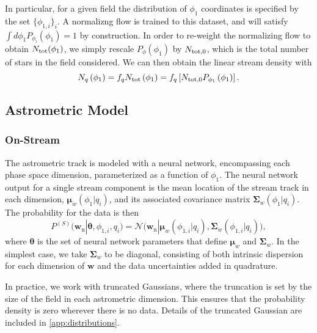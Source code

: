 \documentclass[twocolumn]{aastex631}
\newcommand{\mrm}[1]{\mathrm{#1}}
\newcommand{\mbs}[1]{\boldsymbol{#1}}
\newcommand{\mcal}[1]{\mathcal{#1}}
\newcommand{\nth}[1]{{#1}_{\mrm{n}}}
\newcommand{\pdf}{P}
\begin{document}
        In particular, for a given field the distribution of $\phi_1$ coordinates is specified by the set $\{\phi_{1,i}\}_i$. A normalizng flow is trained to this dataset, and will satisfy $\int d\phi_1 P_{\phi_i}(\phi_1) = 1$ by construction. In order to re-weight the normalizing flow to obtain $N_{\rm tot}(\phi_1)$, we simply rescale $P_{\phi}(\phi_1)$ by $N_{\rm tot,0}$, which is the total number of stars in the field considered. We can then obtain the linear stream density with
        \begin{equation}
            N_q\left(\phi_1\right) = f_q N_{\rm tot} \left(\phi_1\right)  = f_q \left[N_{\rm tot,0} P_{\phi_1}\left(\phi_1\right) \right] .
        \end{equation}

    
        
    \subsection{Astrometric Model} \label{sub:astrometric_model}

        \subsubsection{On-Stream} \label{ssub:astrometric_model_on_stream}
    
            The astrometric track is modeled with a neural network, encompassing each phase space dimension, parameterized as a function of $\phi_1$. The neural network output for a single stream component is the mean location of the stream track in each dimension, $\mbs{\mu}_w(\phi_1 | q_i)$, and its associated covariance matrix $\mbs{\Sigma}_w(\phi_1 | q_i)$. The probability for the data is then
            \begin{equation}
                \pdf^{(S)}(\nth{\mbs{w}} | \mbs{\theta}, \phi_{1,i}, q_i) = \mcal{N}\big(\nth{\mbs{w}} | \mbs{\mu}_w\left(\phi_{1,i} | q_i \right), \mbs{\Sigma}_w\left(\phi_{1,i} | q_i \right) \big),
            \end{equation}
            where $\mbs{\theta}$ is the set of neural network parameters that define $\mbs{\mu}_w$ and $\mbs{\Sigma}_w$.
            In the simplest case, we take $\mbs{\Sigma}_w$ to be diagonal, consisting of both intrinsic dispersion for each dimension of $\mbs{w}$ and the data uncertainties added in quadrature. 

            In practice, we work with truncated Gaussians, where the truncation is set by the size of the field in each astrometric dimension. This ensures that the probability density is zero wherever there is no data. Details of the truncated Gaussian are included in \autoref{app:distributions}.
\end{document}
